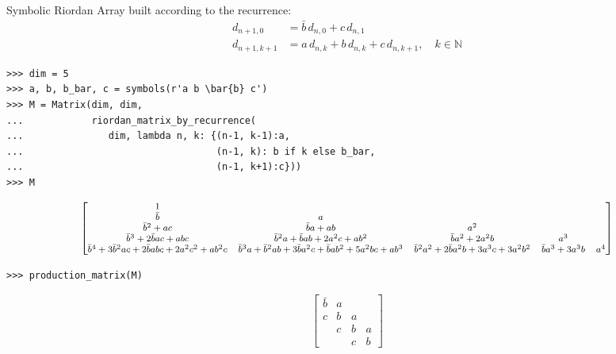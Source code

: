 \begin{example}
Symbolic Riordan Array built according to the recurrence:
\begin{displaymath}
\begin{split}
d_{n+1, 0} &= \bar{b}\,d_{n, 0} + c\,d_{n,1} \\
d_{n+1, k+1} &= a\,d_{n, k} + b\,d_{n, k} + c\,d_{n,k+1}, \quad k \in\mathbb{N}
\end{split}
\end{displaymath}
\begin{verbatim}
>>> dim = 5
>>> a, b, b_bar, c = symbols(r'a b \bar{b} c')
>>> M = Matrix(dim, dim,
...            riordan_matrix_by_recurrence(
...               dim, lambda n, k: {(n-1, k-1):a,
...                                  (n-1, k): b if k else b_bar,
...                                  (n-1, k+1):c}))
>>> M
\end{verbatim}
\begin{displaymath}
\footnotesize
\left[\begin{matrix}1 &   &   &   &  \\\bar{b} & a &   &   &  \\\bar{b}^{2} + a c & \bar{b} a + a b & a^{2} &   &  \\\bar{b}^{3} + 2 \bar{b} a c + a b c & \bar{b}^{2} a + \bar{b} a b + 2 a^{2} c + a b^{2} & \bar{b} a^{2} + 2 a^{2} b & a^{3} &  \\\bar{b}^{4} + 3 \bar{b}^{2} a c + 2 \bar{b} a b c + 2 a^{2} c^{2} + a b^{2} c & \bar{b}^{3} a + \bar{b}^{2} a b + 3 \bar{b} a^{2} c + \bar{b} a b^{2} + 5 a^{2} b c + a b^{3} & \bar{b}^{2} a^{2} + 2 \bar{b} a^{2} b + 3 a^{3} c + 3 a^{2} b^{2} & \bar{b} a^{3} + 3 a^{3} b & a^{4}\end{matrix}\right]
\end{displaymath}
\begin{verbatim}
>>> production_matrix(M)
\end{verbatim}
\begin{displaymath}
\left[\begin{matrix}\bar{b} & a &   &  \\c & b & a &  \\  & c & b & a\\  &   & c & b\end{matrix}\right]
\end{displaymath}
\end{example}


